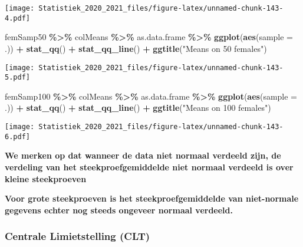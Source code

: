\documentclass[
  12pt,dutch,coursenotes]{book}
\newenvironment{Shaded}{\begin{snugshade}}{\end{snugshade}}
\newcommand{\DataTypeTok}[1]{\textcolor[rgb]{0.13,0.29,0.53}{#1}}
\newcommand{\KeywordTok}[1]{\textcolor[rgb]{0.13,0.29,0.53}{\textbf{#1}}}
\newcommand{\NormalTok}[1]{#1}
\newcommand{\OperatorTok}[1]{\textcolor[rgb]{0.81,0.36,0.00}{\textbf{#1}}}
\newcommand{\StringTok}[1]{\textcolor[rgb]{0.31,0.60,0.02}{#1}}
\theoremstyle{definition}
\theoremstyle{definition}
\theoremstyle{definition}
\theoremstyle{remark}
\begin{document}
\texttt{[image: Statistiek\_2020\_2021\_files/figure-latex/unnamed-chunk-143-4.pdf]}

\begin{Shaded}
\begin{Highlighting}[]
\NormalTok{femSamp50 }\OperatorTok{\%\textgreater{}\%}\StringTok{ }\NormalTok{colMeans }\OperatorTok{\%\textgreater{}\%}\StringTok{ }\NormalTok{as.data.frame }\OperatorTok{\%\textgreater{}\%}\StringTok{ }\KeywordTok{ggplot}\NormalTok{(}\KeywordTok{aes}\NormalTok{(}\DataTypeTok{sample =}\NormalTok{ .)) }\OperatorTok{+}\StringTok{ }
\StringTok{    }\KeywordTok{stat\_qq}\NormalTok{() }\OperatorTok{+}\StringTok{ }\KeywordTok{stat\_qq\_line}\NormalTok{() }\OperatorTok{+}\StringTok{ }\KeywordTok{ggtitle}\NormalTok{(}\StringTok{"Means on 50 females"}\NormalTok{)}
\end{Highlighting}
\end{Shaded}

\texttt{[image: Statistiek\_2020\_2021\_files/figure-latex/unnamed-chunk-143-5.pdf]}

\begin{Shaded}
\begin{Highlighting}[]
\NormalTok{femSamp100 }\OperatorTok{\%\textgreater{}\%}\StringTok{ }\NormalTok{colMeans }\OperatorTok{\%\textgreater{}\%}\StringTok{ }\NormalTok{as.data.frame }\OperatorTok{\%\textgreater{}\%}\StringTok{ }\KeywordTok{ggplot}\NormalTok{(}\KeywordTok{aes}\NormalTok{(}\DataTypeTok{sample =}\NormalTok{ .)) }\OperatorTok{+}\StringTok{ }
\StringTok{    }\KeywordTok{stat\_qq}\NormalTok{() }\OperatorTok{+}\StringTok{ }\KeywordTok{stat\_qq\_line}\NormalTok{() }\OperatorTok{+}\StringTok{ }\KeywordTok{ggtitle}\NormalTok{(}\StringTok{"Means on 100 females"}\NormalTok{)}
\end{Highlighting}
\end{Shaded}

\texttt{[image: Statistiek\_2020\_2021\_files/figure-latex/unnamed-chunk-143-6.pdf]}

\textbf{We merken op dat wanneer de data niet normaal verdeeld zijn, de verdeling van het steekproefgemiddelde niet normaal verdeeld is over kleine steekproeven}

\textbf{Voor grote steekproeven is het steekproefgemiddelde van niet-normale gegevens echter nog steeds ongeveer normaal verdeeld.}

\hypertarget{centrale-limietstelling-clt}{%
\subsubsection{Centrale Limietstelling (CLT)}\label{centrale-limietstelling-clt}}
\end{document}

